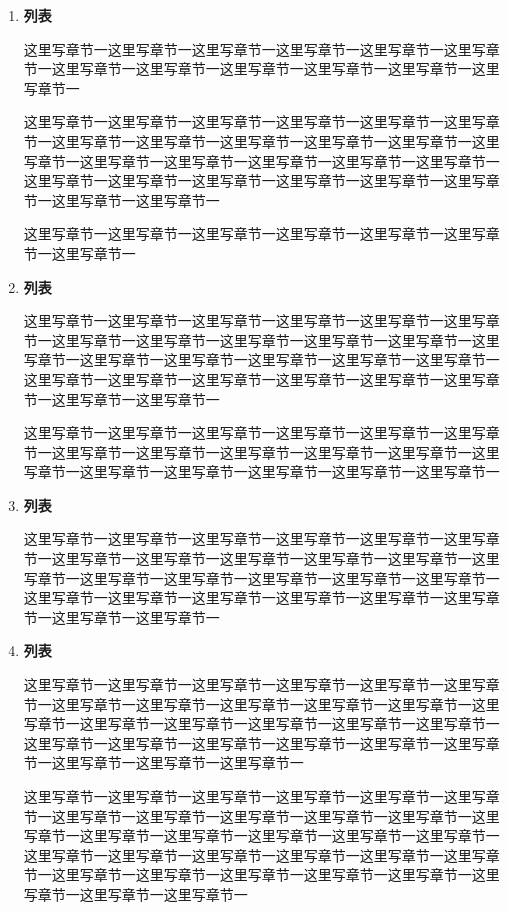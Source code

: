 \documentclass[UTF8,12pt,a4paper]{ctexart}
\begin{document}
\begin{enumerate}
	\setlength{\parindent}{2em}
	\renewcommand{\labelenumi}{\textbf{\theenumi .}}
	\item{\textbf{列表}}

	      这里写章节一这里写章节一这里写章节一这里写章节一这里写章节一这里写章节一这里写章节一这里写章节一这里写章节一这里写章节一这里写章节一这里写章节一
	      
	      这里写章节一这里写章节一这里写章节一这里写章节一这里写章节一这里写章节一这里写章节一这里写章节一这里写章节一这里写章节一这里写章节一这里写章节一这里写章节一这里写章节一这里写章节一这里写章节一这里写章节一这里写章节一这里写章节一这里写章节一这里写章节一这里写章节一这里写章节一这里写章节一这里写章节一
	      
	      这里写章节一这里写章节一这里写章节一这里写章节一这里写章节一这里写章节一这里写章节一
	\item{\textbf{列表}}

	      这里写章节一这里写章节一这里写章节一这里写章节一这里写章节一这里写章节一这里写章节一这里写章节一这里写章节一这里写章节一这里写章节一这里写章节一这里写章节一这里写章节一这里写章节一这里写章节一这里写章节一这里写章节一这里写章节一这里写章节一这里写章节一这里写章节一这里写章节一这里写章节一这里写章节一

	      这里写章节一这里写章节一这里写章节一这里写章节一这里写章节一这里写章节一这里写章节一这里写章节一这里写章节一这里写章节一这里写章节一这里写章节一这里写章节一这里写章节一这里写章节一这里写章节一这里写章节一
	\item{\textbf{列表}}

	      这里写章节一这里写章节一这里写章节一这里写章节一这里写章节一这里写章节一这里写章节一这里写章节一这里写章节一这里写章节一这里写章节一这里写章节一这里写章节一这里写章节一这里写章节一这里写章节一这里写章节一这里写章节一这里写章节一这里写章节一这里写章节一这里写章节一这里写章节一这里写章节一这里写章节一
	\item{\textbf{列表}}

	      这里写章节一这里写章节一这里写章节一这里写章节一这里写章节一这里写章节一这里写章节一这里写章节一这里写章节一这里写章节一这里写章节一这里写章节一这里写章节一这里写章节一这里写章节一这里写章节一这里写章节一这里写章节一这里写章节一这里写章节一这里写章节一这里写章节一这里写章节一这里写章节一这里写章节一这里写章节一

	      这里写章节一这里写章节一这里写章节一这里写章节一这里写章节一这里写章节一这里写章节一这里写章节一这里写章节一这里写章节一这里写章节一这里写章节一这里写章节一这里写章节一这里写章节一这里写章节一这里写章节一这里写章节一这里写章节一这里写章节一这里写章节一这里写章节一这里写章节一这里写章节一这里写章节一这里写章节一这里写章节一这里写章节一这里写章节一这里写章节一这里写章节一

\end{enumerate}
\end{document}
